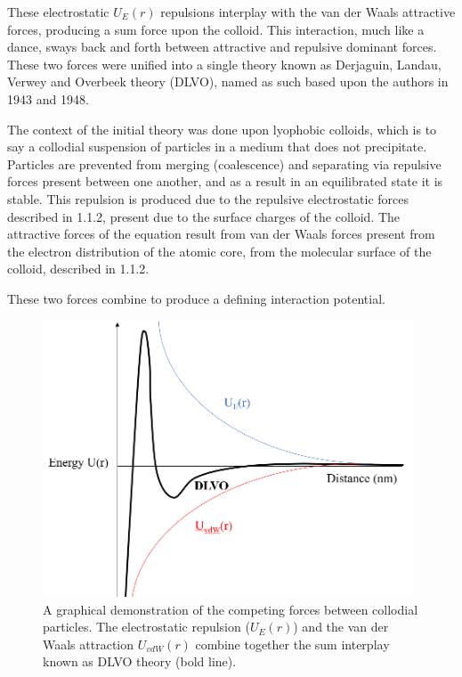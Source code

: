 These electrostatic $U_E(r)$ repulsions interplay with the van der Waals attractive forces, producing a sum force upon the colloid. This interaction, much like a dance, sways back and forth between attractive and repulsive dominant forces. These two forces were unified into a single theory known as Derjaguin, Landau, Verwey and Overbeek theory (DLVO), named as such based upon the authors in 1943 and 1948.\cite{DLVOorign} \cite{Origin2V} \cite{DERJAGUINORIGIN}

The context of the initial theory was done upon lyophobic colloids, which is to say a collodial suspension of particles in a medium that does not precipitate. Particles are prevented from merging (coalescence) and separating via repulsive forces present between one another, and as a result in an equilibrated state it is stable. This repulsion is produced due to the repulsive electrostatic forces described in 1.1.2, present due to the surface charges of the colloid. The attractive forces of the equation result from van der Waals forces present from the electron distribution of the atomic core, from the molecular surface of the colloid, described in 1.1.2.\cite{DLVOthesis}

These two forces combine to produce a defining interaction potential.

\begin{figure}[h]     %
        \begin{center}
          \includegraphics[width=110mm]{chapter1/DLVO.PNG}
\end{center}
\caption{A graphical demonstration of the competing forces between collodial particles. The electrostatic repulsion ($U_E(r)$) and the van der Waals attraction $U_{vdW}(r)$ combine together the sum interplay known as DLVO theory (bold line).}
\label{fig:DLVO}                 %
\end{figure}

